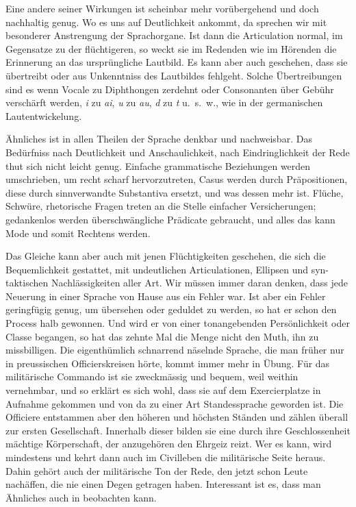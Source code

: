 {Eine andere seiner Wirkungen ist scheinbar mehr vorübergehend und doch nachhaltig genug. Wo es uns auf Deutlichkeit ankommt, da sprechen wir mit besonderer Anstrengung der Sprachorgane. Ist dann die Articulation normal, im Gegensatze zu der flüchtigeren, so weckt sie im Redenden wie im Hörenden die Erinnerung an das ursprüngliche Lautbild. Es kann aber auch geschehen, dass sie übertreibt oder aus Unkenntniss des  Lautbildes fehlgeht. Solche Übertreibungen sind es  wenn Vocale zu Diphthongen zerdehnt oder Consonanten über Gebühr verschärft werden, \textit{i} zu \textit{ai}, \textit{u} zu \textit{au}, \textit{d} zu \textit{t} u.~s.~w., wie in der germanischen Lautentwickelung.

Ähnliches ist in allen Theilen der Sprache denkbar und nachweisbar. Das Bedürfniss nach Deutlichkeit und Anschaulichkeit, nach Eindringlichkeit der Rede thut sich nicht leicht genug. Einfache grammatische Beziehungen werden umschrieben, um recht scharf hervorzutreten, Casus werden durch Präpositionen, diese durch sinnverwandte Substantiva ersetzt, und was dessen mehr ist. Flüche, Schwüre, rhetorische Fragen treten an die Stelle einfacher Versicherungen; gedankenlos werden überschwängliche Prädicate gebraucht, und alles das kann Mode und somit Rechtens werden.

Das Gleiche kann aber auch mit jenen Flüchtigkeiten geschehen, die sich die Bequemlichkeit gestattet, mit undeutlichen Articulationen, Ellipsen und syn- \label{sp.184} taktischen Nachlässigkeiten aller Art. Wir müssen \label{fp.194} immer daran denken, dass jede Neuerung in einer Sprache von Hause aus ein Fehler war. Ist aber ein Fehler geringfügig genug, um übersehen oder geduldet zu werden, so hat er schon den Process halb gewonnen. Und wird er von einer tonangebenden Persönlichkeit oder Classe begangen, so hat das zehnte Mal die Menge nicht den Muth, ihn zu missbilligen. Die eigenthümlich schnarrend näselnde Sprache, die man früher nur in preussischen Officierskreisen hörte, kommt immer mehr in Übung. Für das militärische Commando ist sie zweckmässig und bequem, weil weithin vernehmbar, und so erklärt es sich wohl, dass sie auf dem Exercierplatze in Aufnahme gekommen und von da zu einer Art Standessprache geworden ist. Die Officiere entstammen aber den höheren und höchsten Ständen und zählen überall zur ersten Gesellschaft. Innerhalb dieser bilden sie eine durch ihre Geschlossenheit mächtige Körperschaft, der anzugehören den Ehrgeiz reizt. Wer es kann, wird mindestens  und kehrt dann auch im Civilleben die militärische Seite heraus. Dahin gehört auch der militärische Ton der Rede, den jetzt schon Leute nachäffen, die nie einen Degen getragen haben. Interessant ist es, dass man Ähnliches auch in  beobachten kann.

}
